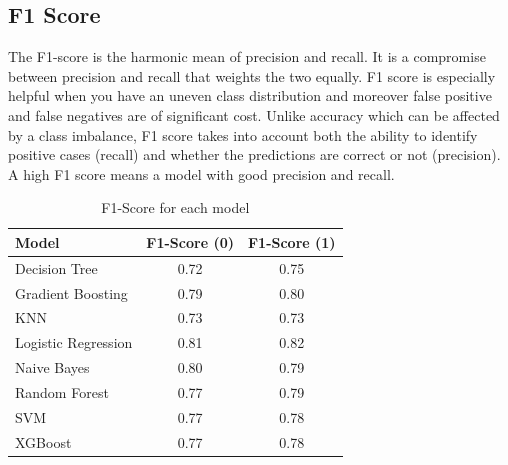 \subsection{\textbf{F1 Score}}
The F1-score is the harmonic mean of precision and recall. It is a compromise between precision and recall that weights the two equally. F1 score is especially helpful when you have an uneven class distribution and moreover false positive and false negatives are of significant cost. Unlike accuracy which can be affected by a class imbalance, F1 score takes into account both the ability to identify positive cases (recall) and whether the predictions are correct or not (precision). A high F1 score means a model with good precision and recall.
 \begin{table}[H]
\centering
\begin{tabular}{|l|c|c|}
\hline
\textbf{Model} & \textbf{F1-Score (0)} & \textbf{F1-Score (1)} \\
\hline
Decision Tree       & 0.72 & 0.75 \\\hline
Gradient Boosting   & 0.79 & 0.80 \\\hline
KNN                 & 0.73 & 0.73 \\\hline
Logistic Regression & 0.81 & 0.82 \\\hline
Naive Bayes         & 0.80 & 0.79 \\\hline
Random Forest       & 0.77 & 0.79 \\\hline
SVM                 & 0.77 & 0.78 \\\hline
XGBoost             & 0.77 & 0.78 \\
\hline
\end{tabular}
\caption{F1-Score for each model}
\end{table}






